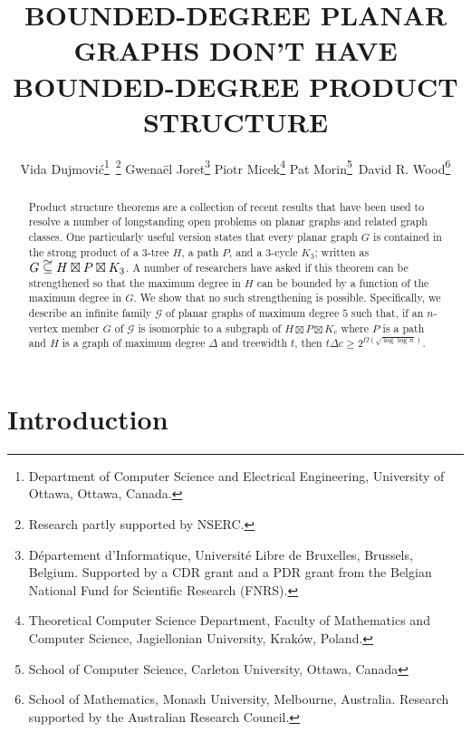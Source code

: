 \documentclass{patmorin}
\title{\MakeUppercase{Bounded-Degree Planar Graphs Don't Have Bounded-Degree Product Structure}}
\author{%
  Vida Dujmović\thanks{Department of Computer Science and Electrical Engineering, University of Ottawa, Ottawa, Canada.}\, \thanks{Research partly supported by NSERC.} \quad
  Gwenaël Joret\thanks{D\'epartement d'Informatique, Universit\'e Libre de Bruxelles, Brussels, Belgium.
  Supported by a CDR grant and a PDR grant from the Belgian National Fund for Scientific Research (FNRS).} \quad
  Piotr Micek\thanks{Theoretical Computer Science Department, Faculty of Mathematics and Computer Science, Jagiellonian University, Krak\'ow, Poland.}\quad
  Pat Morin\thanks{School of Computer Science, Carleton University, Ottawa, Canada}\, \footnotemark[2] \quad
  David R. Wood\thanks{School of Mathematics, Monash University, Melbourne, Australia.
  Research supported by the Australian Research Council.}
}
\date{}
\newcommand\subsetcong{\mathrel{\text{%
    \setbox0\hbox{$\subseteq$}%
    \rlap{\hbox to \wd0{\hss\hss\hss\raisebox{1.5\height}{$\sim$}\hss}}\box0
}}}
\renewcommand{\ge}{\geqslant}
\begin{document}
\maketitle


\begin{abstract}
   Product structure theorems are a collection of recent results that have been used to resolve a number of longstanding open problems on planar graphs and related graph classes.  One particularly useful version states that every planar graph $G$ is contained in the strong product of a $3$-tree $H$, a path $P$, and a $3$-cycle $K_3$; written as $G\subsetcong H\boxtimes P\boxtimes K_3$.  A number of researchers have asked if this theorem can be strengthened so that the maximum degree in $H$ can be bounded by a function of the maximum degree in $G$.  We show that no such strengthening is possible.  Specifically, we describe an infinite family $\mathcal{G}$ of planar graphs of maximum degree $5$ such that, if an $n$-vertex member $G$ of $\mathcal{G}$ is isomorphic to a subgraph of $H\boxtimes P\boxtimes K_c$ where $P$ is a path and $H$ is a graph of maximum degree $\Delta$ and treewidth $t$, then $t\Delta c \ge 2^{\Omega(\sqrt{\log\log n})}$.
\end{abstract}

\section{Introduction}
\end{document}
